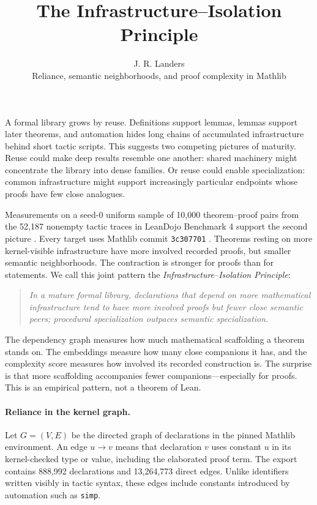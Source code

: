 \documentclass[11pt]{article}
\title{\vspace{-1.6em}\textbf{The Infrastructure--Isolation Principle}\vspace{-0.5em}}
\author{J. R. Landers\\[-1pt]\small Reliance, semantic neighborhoods, and proof complexity in Mathlib}
\date{\vspace{-1.2em}}
\begin{document}
\maketitle
\vspace{-1.6em}

A formal library grows by reuse.  Definitions support lemmas, lemmas support later theorems, and
automation hides long chains of accumulated infrastructure behind short tactic scripts.  This
suggests two competing pictures of maturity.  Reuse could make deep results resemble one another:
shared machinery might concentrate the library into dense families.  Or reuse could enable
specialization: common infrastructure might support increasingly particular endpoints whose proofs
have few close analogues.

Measurements on a seed-0 uniform sample of 10,000 theorem--proof pairs from the 52,187 nonempty
tactic traces in LeanDojo Benchmark 4 support the second picture \cite{leandojo}.  Every target uses
Mathlib commit \texttt{3c307701} \cite{mathlib}.  Theorems resting on more kernel-visible infrastructure
have more involved recorded proofs, but smaller semantic neighborhoods.  The contraction is stronger
for proofs than for statements.  We call this joint pattern the \emph{Infrastructure--Isolation Principle}:

\begin{quote}
\emph{In a mature formal library, declarations that depend on more mathematical infrastructure
tend to have more involved proofs but fewer close semantic peers; procedural specialization
outpaces semantic specialization.}
\end{quote}

\begin{intuitionbox}
The dependency graph measures how much mathematical scaffolding a theorem stands on.  The
embeddings measure how many close companions it has, and the complexity score measures how
involved its recorded construction is.  The surprise is that more scaffolding accompanies fewer
companions---especially for proofs.  This is an empirical pattern, not a theorem of Lean.
\end{intuitionbox}

\paragraph{Reliance in the kernel graph.}
Let $G=(V,E)$ be the directed graph of declarations in the pinned Mathlib environment.  An edge
$u\to v$ means that declaration $v$ uses constant $u$ in its kernel-checked type or value, including
the elaborated proof term.  The export contains 888,992 declarations and 13,264,773 direct edges.
Unlike identifiers written visibly in tactic syntax, these edges include constants introduced by
automation such as \texttt{simp}.
\end{document}
